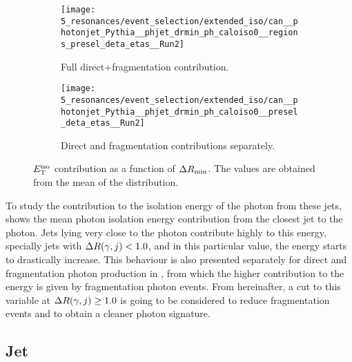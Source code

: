 \begin{figure}[ht!]
    \centering
    \begin{subfigure}[t]{0.49\linewidth}
        \centering
        \texttt{[image: 5\_resonances/event\_selection/extended\_iso/can\_\_photonjet\_Pythia\_\_phjet\_drmin\_ph\_caloiso0\_\_regions\_presel\_deta\_etas\_\_Run2]}
        \caption{Full direct+fragmentation contribution.}
        \label{fig:evt_selection:sr_opt:extended_iso:phjet_drmin:etiso:full}
    \end{subfigure}
    \hfill
    \begin{subfigure}[t]{0.49\linewidth}
        \centering
        \texttt{[image: 5\_resonances/event\_selection/extended\_iso/can\_\_photonjet\_Pythia\_\_phjet\_drmin\_ph\_caloiso0\_\_presel\_deta\_etas\_\_Run2]}
        \caption{Direct and fragmentation contributions separately.}
        \label{fig:evt_selection:sr_opt:extended_iso:phjet_drmin:etiso:separated}
    \end{subfigure}
    \caption{\(E_{\text{T}}^{\text{iso}}\) contribution as a function of \(\Delta R_{\text{min}}\). The \etiso values are obtained from the mean of the \etiso distribution.}
    \label{fig:evt_selection:sr_opt:extended_iso:phjet_drmin:etiso}
\end{figure}

To study the contribution to the isolation energy of the photon from these jets, \Fig{\ref{fig:evt_selection:sr_opt:extended_iso:phjet_drmin:etiso:full}} shows the mean photon isolation energy contribution from the closest jet to the photon. Jets lying very close to the photon contribute highly to this energy, specially jets with \(\Delta R (\gamma, j) < 1.0\), and in this particular value, the energy starts to drastically increase. This behaviour is also presented separately for direct and fragmentation photon production in \Fig{\ref{fig:evt_selection:sr_opt:extended_iso:phjet_drmin:etiso:separated}}, from which the higher contribution to the energy is given by fragmentation photon events.
From hereinafter, a cut to this variable at \(\Delta R (\gamma, j) \geq 1.0\) is going to be considered to reduce fragmentation events and to obtain a cleaner photon signature.






\subsection{Jet \texorpdfstring{\pt}{pT}}
\label{subsec:evt_selection:sr_opt:jet_pt}


